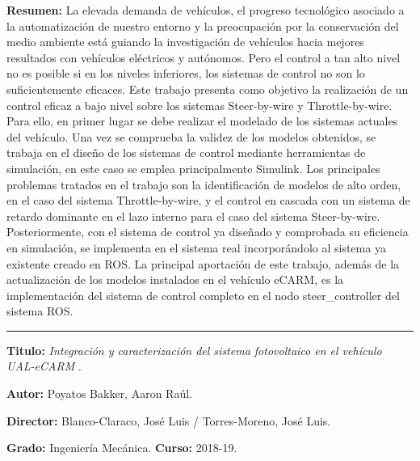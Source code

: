 \textbf{Resumen:} La elevada demanda de vehículos, el progreso tecnológico asociado a la automatización de nuestro entorno y la preocupación por la conservación del medio ambiente está guiando la investigación de vehículos hacia mejores resultados con vehículos eléctricos y autónomos. Pero el control a tan alto nivel no es posible si en los niveles inferiores, los sistemas de control no son lo suficientemente eficaces. Este trabajo presenta como objetivo la realización de un control eficaz a bajo nivel sobre los sistemas Steer-by-wire y Throttle-by-wire. Para ello, en primer lugar se debe realizar el modelado de los sistemas actuales del vehículo. Una vez se comprueba la validez de los modelos obtenidos, se trabaja en el diseño de los sistemas de control mediante herramientas de simulación, en este caso se emplea principalmente Simulink. Los principales problemas tratados en el trabajo son la identificación de modelos de alto orden, en el caso del sistema Throttle-by-wire, y el control en cascada con un sistema de retardo dominante en el lazo interno para el caso del sistema Steer-by-wire. Posteriormente, con el sistema de control ya diseñado y comprobada su eficiencia en simulación, se implementa en el sistema real incorporándolo al sistema ya existente creado en ROS. La principal aportación de este trabajo, además de la actualización de los modelos instalados en el vehículo eCARM, es la implementación del sistema de control completo en el nodo steer\_controller del sistema ROS.

\vspace{6pt} \hrule \vspace{6pt}
 
\textbf{Titulo:} \textit{Integración y caracterización del sistema fotovoltaico en el vehículo UAL-eCARM} \cite{poyatos2019UALeCARM}.

\textbf{Autor:} Poyatos Bakker, Aaron Raúl.

\textbf{Director:} Blanco-Claraco, José Luis / Torres-Moreno, José Luis.

\textbf{Grado:} Ingeniería Mecánica. \textbf{Curso:} 2018-19. 

 

